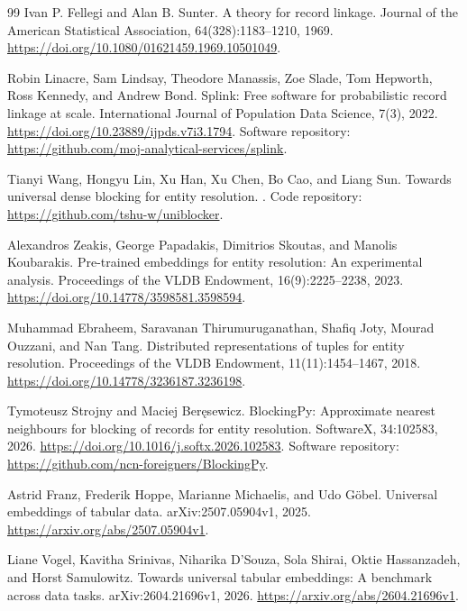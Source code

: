\documentclass[conference]{IEEEtran}
\begin{document}
\begin{thebibliography}{99}
Ivan P. Fellegi and Alan B. Sunter.
\newblock A theory for record linkage.
\newblock Journal of the American Statistical Association, 64(328):1183--1210, 1969.
\newblock \url{https://doi.org/10.1080/01621459.1969.10501049}.

Robin Linacre, Sam Lindsay, Theodore Manassis, Zoe Slade, Tom Hepworth, Ross Kennedy, and Andrew Bond.
\newblock Splink: Free software for probabilistic record linkage at scale.
\newblock International Journal of Population Data Science, 7(3), 2022.
\newblock \url{https://doi.org/10.23889/ijpds.v7i3.1794}.
\newblock Software repository: \url{https://github.com/moj-analytical-services/splink}.

Tianyi Wang, Hongyu Lin, Xu Han, Xu Chen, Bo Cao, and Liang Sun.
\newblock Towards universal dense blocking for entity resolution.
.
\newblock Code repository: \url{https://github.com/tshu-w/uniblocker}.

Alexandros Zeakis, George Papadakis, Dimitrios Skoutas, and Manolis Koubarakis.
\newblock Pre-trained embeddings for entity resolution: An experimental analysis.
\newblock Proceedings of the VLDB Endowment, 16(9):2225--2238, 2023.
\newblock \url{https://doi.org/10.14778/3598581.3598594}.

Muhammad Ebraheem, Saravanan Thirumuruganathan, Shafiq Joty, Mourad Ouzzani, and Nan Tang.
\newblock Distributed representations of tuples for entity resolution.
\newblock Proceedings of the VLDB Endowment, 11(11):1454--1467, 2018.
\newblock \url{https://doi.org/10.14778/3236187.3236198}.

Tymoteusz Strojny and Maciej Ber\k{e}sewicz.
\newblock BlockingPy: Approximate nearest neighbours for blocking of records for entity resolution.
\newblock SoftwareX, 34:102583, 2026.
\newblock \url{https://doi.org/10.1016/j.softx.2026.102583}.
\newblock Software repository: \url{https://github.com/ncn-foreigners/BlockingPy}.

Astrid Franz, Frederik Hoppe, Marianne Michaelis, and Udo G\"obel.
\newblock Universal embeddings of tabular data.
\newblock arXiv:2507.05904v1, 2025.
\newblock \url{https://arxiv.org/abs/2507.05904v1}.

Liane Vogel, Kavitha Srinivas, Niharika D'Souza, Sola Shirai, Oktie Hassanzadeh, and Horst Samulowitz.
\newblock Towards universal tabular embeddings: A benchmark across data tasks.
\newblock arXiv:2604.21696v1, 2026.
\newblock \url{https://arxiv.org/abs/2604.21696v1}.


\end{thebibliography}
\end{document}
